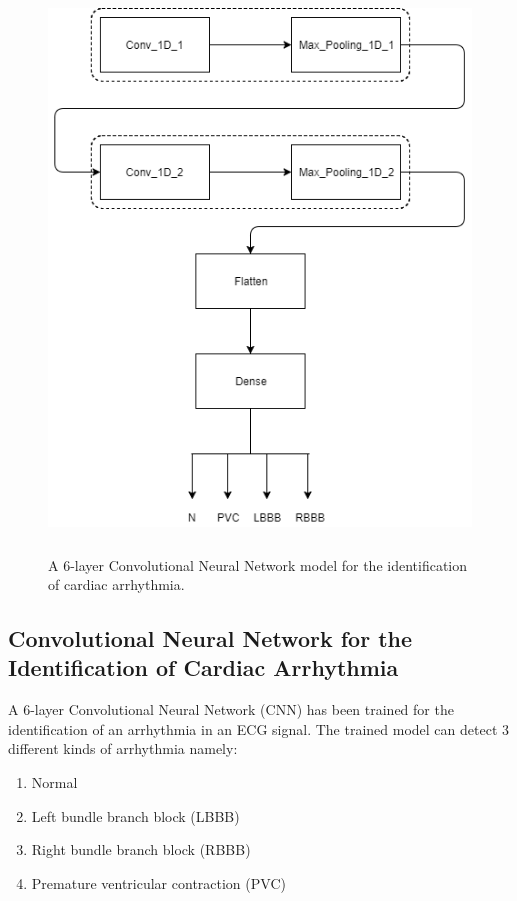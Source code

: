 \begin{figure}[htpb]
	\centering
	\includegraphics[width=20cm,height=15cm,keepaspectratio=true]{images/cnn_model}
	\caption{
		A 6-layer Convolutional Neural Network model for the identification of cardiac arrhythmia.
	}
	\label{fig:cnn_model}
\end{figure}


\subsection{Convolutional Neural Network for the Identification of Cardiac Arrhythmia}
A 6-layer Convolutional Neural Network (CNN) has been trained for the identification of an arrhythmia in an ECG signal. The trained model can detect 3 different kinds of arrhythmia namely:

\begin{enumerate}
	\item Normal
	\item Left bundle branch block (LBBB)
	\item Right bundle branch block (RBBB)
	\item Premature ventricular contraction (PVC)
\end{enumerate}

